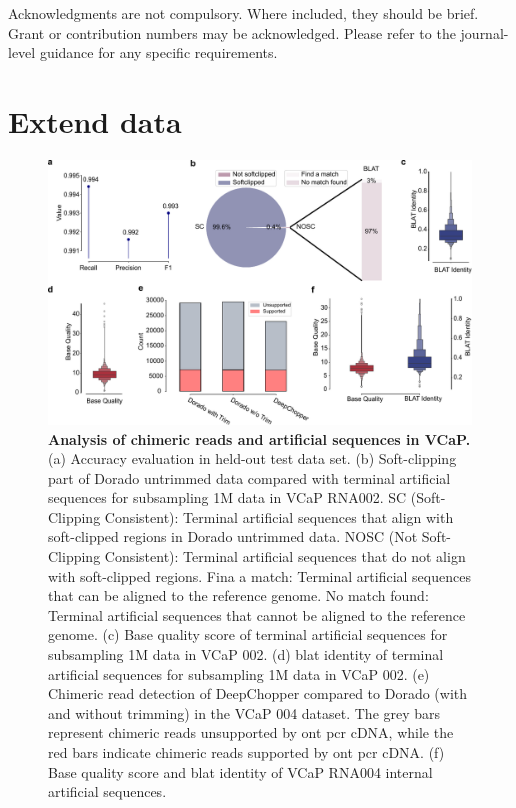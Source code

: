 \documentclass[pdflatex,sn-nature, lineno]{sn-jnl}%
\theoremstyle{thmstyleone}%
\theoremstyle{thmstyletwo}%
\theoremstyle{thmstylethree}%
\begin{document}
Acknowledgments are not compulsory. Where included, they should be brief. Grant or contribution numbers may be acknowledged.
Please refer to the journal-level guidance for any specific requirements.


\backmatter

\begin{appendices}
	\printglossaries[type=\acronymtype, title=Abbreviations]
\end{appendices}



\newpage

\section{Extend data}

\renewcommand{\figurename}{Extended Data Fig.}


\begin{figure}[!h]
	\includegraphics[height=0.63\columnwidth]{finals/sf1}
	\caption{ {\bf Analysis of chimeric reads and artificial sequences in VCaP.} (a) Accuracy evaluation in held-out test data set. (b) Soft-clipping part of Dorado untrimmed data compared with terminal artificial sequences for subsampling 1M data in VCaP RNA002. SC (Soft-Clipping Consistent): Terminal artificial sequences that align with soft-clipped regions in Dorado untrimmed data. NOSC (Not Soft-Clipping Consistent): Terminal artificial sequences that do not align with soft-clipped regions. Fina a match: Terminal artificial sequences that can be aligned to the reference genome. No match found: Terminal artificial sequences that cannot be aligned to the reference genome. (c) Base quality score of terminal artificial sequences for subsampling 1M data in VCaP 002. (d) \gls{blat} identity of terminal artificial sequences for subsampling 1M data in VCaP 002. (e) Chimeric read detection of DeepChopper compared to Dorado (with and without trimming) in the VCaP 004 dataset. The grey bars represent chimeric reads unsupported by \gls{ont} \gls{pcr} cDNA, while the red bars indicate chimeric reads supported by \gls{ont} \gls{pcr} cDNA.  (f) Base quality score and \gls{blat} identity of VCaP RNA004 internal artificial sequences.}\label{fig:sf1}
\end{figure}
\end{document}
